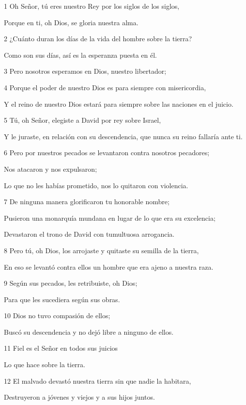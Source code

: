 \par 1 Oh Señor, tú eres nuestro Rey por los siglos de los siglos,
\par     Porque en ti, oh Dios, se gloria nuestra alma.
\par 2 ¿Cuánto duran los días de la vida del hombre sobre la tierra?
\par     Como son sus días, así es la esperanza puesta en él.
\par 3 Pero nosotros esperamos en Dios, nuestro libertador;
\par 4 Porque el poder de nuestro Dios es para siempre con misericordia,
\par     Y el reino de nuestro Dios estará para siempre sobre las naciones en el juicio.
\par   
\par 5 Tú, oh Señor, elegiste a David por rey sobre Israel,
\par     Y le juraste, en relación con su descendencia, que nunca su reino fallaría ante ti.
\par 6 Pero por nuestros pecados se levantaron contra nosotros pecadores;
\par     Nos atacaron y nos expulsaron;
\par     Lo que no les habías prometido, nos lo quitaron con violencia.
\par 7 De ninguna manera glorificaron tu honorable nombre;
\par     Pusieron una monarquía mundana en lugar de lo que era su excelencia;
\par     Devastaron el trono de David con tumultuosa arrogancia.
\par 8 Pero tú, oh Dios, los arrojaste y quitaste su semilla de la tierra,
\par     En eso se levantó contra ellos un hombre que era ajeno a nuestra raza.
\par 9 Según sus pecados, les retribuiste, oh Dios;
\par     Para que les sucediera según sus obras.
\par 10 Dios no tuvo compasión de ellos;
\par     Buscó su descendencia y no dejó libre a ninguno de ellos.
\par 11 Fiel es el Señor en todos sus juicios
\par     Lo que hace sobre la tierra.
\par   
\par 12 El malvado devastó nuestra tierra sin que nadie la habitara,
\par     Destruyeron a jóvenes y viejos y a sus hijos juntos.

